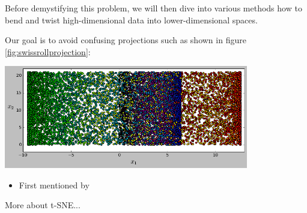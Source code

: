 \begin{minipage}[c]{0.55\linewidth}
Before demystifying this problem, we will then dive into various methods how to bend and twist high-dimensional data into lower-dimensional spaces.

Our goal is to avoid confusing projections such as shown in figure \ref{fig:swissrollprojection}:

\begin{center}
	\includegraphics[width=0.8\textwidth]{external_content/graphs/swiss_roll-projection.png}
	\captionsetup{justification=centering,type=htypei}
	\label{fig:swissrollprojection}
\end{center}
\end{minipage}%

\begin{itemize}
	\item First mentioned by \cite{van2008visualizing}
\end{itemize}

\clearpage

More about t-SNE...
